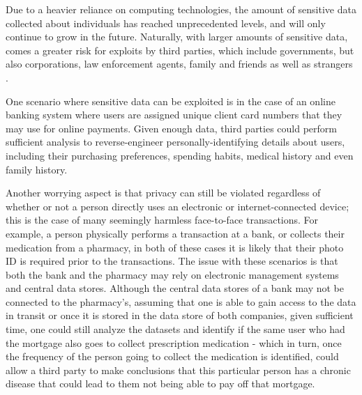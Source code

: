 \documentclass{sigchi}
\begin{document}
Due to a heavier reliance on computing technologies, the amount of sensitive data collected about individuals has 
reached unprecedented levels, and will only continue to grow in the future. Naturally, with larger amounts of sensitive data, comes a greater risk for exploits by third parties, which include governments, but also corporations, law enforcement agents, family and friends as well as strangers \cite{scuPrivacyDefine}.

One scenario where sensitive data can be exploited is in the case of an online banking system where users are assigned unique client card numbers that they may use for online payments. Given enough data, third parties could perform sufficient analysis to reverse-engineer personally-identifying details about users, including their purchasing preferences, spending habits, medical history and even family history. 

Another worrying aspect is that privacy can still be violated regardless of whether or not a person directly uses an electronic or internet-connected device; this is the case of many seemingly harmless face-to-face transactions. For example, a person physically performs a transaction at a bank, or collects their medication from a pharmacy, in both of these cases it is likely that their photo ID is required prior to the transactions. The issue with these scenarios is that both the bank and the pharmacy may rely on electronic management systems and central data stores. Although the central data stores of a bank may not be connected to the pharmacy's, assuming that one is able to gain access to the data in transit or once it is stored in the data store of both companies, given sufficient time, one could still analyze the datasets and identify if the same user who had the mortgage also goes to collect prescription medication - which in turn, once the frequency of the person going to collect the medication is identified, could allow a third party to make conclusions that this particular person has a chronic disease that could lead to them not being able to pay off that mortgage. 
\end{document}
